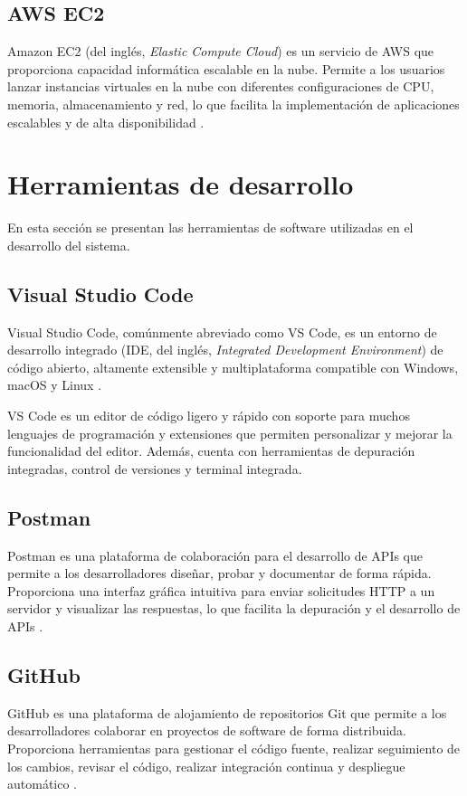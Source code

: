 \subsection{AWS EC2}

Amazon EC2 (del inglés, \textit{Elastic Compute Cloud}) es un servicio de AWS
que proporciona capacidad informática escalable en la nube. Permite a los
usuarios lanzar instancias virtuales en la nube con diferentes configuraciones
de CPU, memoria, almacenamiento y red, lo que facilita la implementación de
aplicaciones escalables y de alta disponibilidad \cite{AWS_EC2}.


\section{Herramientas de desarrollo}

En esta sección se presentan las herramientas de software utilizadas en el
desarrollo del sistema.

\subsection{Visual Studio Code}

Visual Studio Code, comúnmente abreviado como VS Code, es un entorno de
desarrollo integrado (IDE, del inglés, \textit{Integrated Development
	Environment}) de código abierto, altamente extensible y multiplataforma
compatible con Windows, macOS y Linux \cite{VSCode}.

VS Code es un editor de código ligero y rápido con soporte para muchos
lenguajes de programación y extensiones que permiten personalizar y mejorar la
funcionalidad del editor. Además, cuenta con herramientas de depuración
integradas, control de versiones y terminal integrada.%

\subsection{Postman}

Postman es una plataforma de colaboración para el desarrollo de APIs que
permite a los desarrolladores diseñar, probar y documentar de forma rápida.
Proporciona una interfaz gráfica intuitiva para enviar solicitudes HTTP a un
servidor y visualizar las respuestas, lo que facilita la depuración y el
desarrollo de APIs \cite{Postman}.

\subsection{GitHub}

GitHub es una plataforma de alojamiento de repositorios Git \cite{Git} que
permite a los desarrolladores colaborar en proyectos de software de forma
distribuida. Proporciona herramientas para gestionar el código fuente, realizar
seguimiento de los cambios, revisar el código, realizar integración continua y
despliegue automático \cite{Github}.

